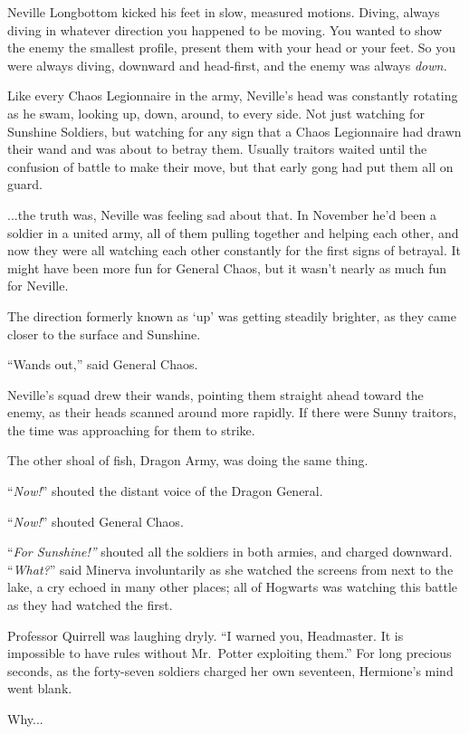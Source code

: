 Neville Longbottom kicked his feet in slow, measured motions. Diving, always diving in whatever direction you happened to be moving. You wanted to show the enemy the smallest profile, present them with your head or your feet. So you were always diving, downward and head-first, and the enemy was always \emph{down.}

Like every Chaos Legionnaire in the army, Neville’s head was constantly rotating as he swam, looking up, down, around, to every side. Not just watching for Sunshine Soldiers, but watching for any sign that a Chaos Legionnaire had drawn their wand and was about to betray them. Usually traitors waited until the confusion of battle to make their move, but that early gong had put them all on guard.

...the truth was, Neville was feeling sad about that. In November he’d been a soldier in a united army, all of them pulling together and helping each other, and now they were all watching each other constantly for the first signs of betrayal. It might have been more fun for General Chaos, but it wasn’t nearly as much fun for Neville.

The direction formerly known as ‘up’ was getting steadily brighter, as they came closer to the surface and Sunshine.

“Wands out,” said General Chaos.

Neville’s squad drew their wands, pointing them straight ahead toward the enemy, as their heads scanned around more rapidly. If there were Sunny traitors, the time was approaching for them to strike.

The other shoal of fish, Dragon Army, was doing the same thing.

“\emph{Now!}” shouted the distant voice of the Dragon General.

“\emph{Now!}” shouted General Chaos.

“\emph{For Sunshine!”} shouted all the soldiers in both armies, and charged downward.
\sbreak
“\emph{What?}” said Minerva involuntarily as she watched the screens from next to the lake, a cry echoed in many other places; all of Hogwarts was watching this battle as they had watched the first.

Professor Quirrell was laughing dryly. “I warned you, Headmaster. It is impossible to have rules without Mr.~Potter exploiting them.”
\sbreak
For long precious seconds, as the forty-seven soldiers charged her own seventeen, Hermione’s mind went blank.

Why...

